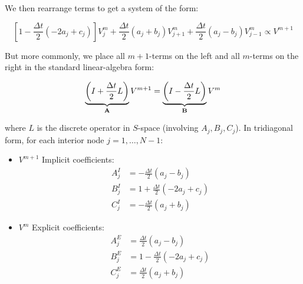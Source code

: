     We then rearrange terms to get a system of the form:

    \begin{equation}
        \left[
            1 - \frac{\Delta t}{2} \left(-2a_j + c_j\right)
        \right] V_j^{m}
        + \frac{\Delta t}{2} \left(a_j + b_j\right) V_{j+1}^{m}
        + \frac{\Delta t}{2} \left(a_j - b_j\right) V_{j-1}^{m}
        \propto V^{m+1}
        \label{eq:cn_rearranged}
    \end{equation}

    But more commonly, we place all $m+1$-terms on the left and all $m$-terms on the right in the standard linear-algebra form:

    \begin{equation}
        \underbrace{
            \left(I + \frac{\Delta t}{2} L\right)
        }_{\text{\textbf{A}}}
        V^{m+1}
        =
        \underbrace{
            \left(I - \frac{\Delta t}{2} L\right)
        }_{\text{\textbf{B}}}
        V^m
        \label{eq:cn_matrix_form}
    \end{equation}

    where $L$ is the discrete operator in $S$-space (involving $A_j, B_j, C_j$).
    In tridiagonal form, for each interior node $j = 1, \ldots, N-1$:


    \begin{itemize}
        \item \textbf{$V^{m+1}$} Implicit coefficients:
            \begin{equation*}
                \begin{aligned}
                    A_j^{I} &= -\frac{\Delta t}{2} \left(a_j - b_j\right) \\
                    B_j^{I} &= 1 + \frac{\Delta t}{2} \left(-2a_j + c_j\right) \\
                    C_j^{I} &= -\frac{\Delta t}{2} \left(a_j + b_j\right)
                \end{aligned}
            \end{equation*}

        \item \textbf{$V^m$} Explicit coefficients:
            \begin{equation*}
                \begin{aligned}
                    A_j^{E} &= \frac{\Delta t}{2} \left(a_j - b_j\right) \\
                    B_j^{E} &= 1 - \frac{\Delta t}{2} \left(-2a_j + c_j\right) \\
                    C_j^{E} &= \frac{\Delta t}{2} \left(a_j + b_j\right)
                \end{aligned}
            \end{equation*}
    \end{itemize}

